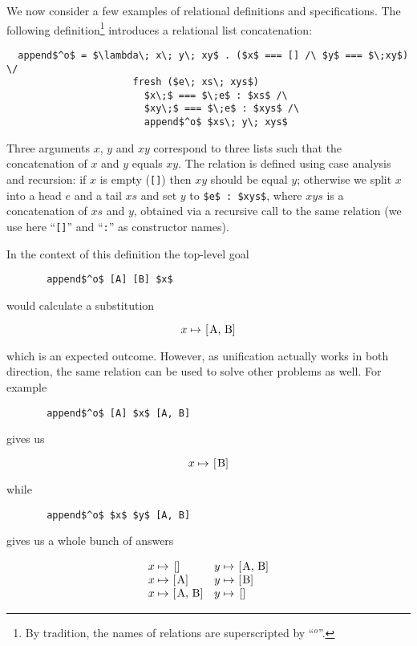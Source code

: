 We now consider a few examples of relational definitions and specifications. The following definition\footnote{By tradition, the names of relations are superscripted by ``$^o$''.}
introduces a relational list concatenation:

\begin{lstlisting}
  append$^o$ = $\lambda\; x\; y\; xy$ . ($x$ === [] /\ $y$ === $\;xy$) \/
                      fresh ($e\; xs\; xys$) 
                        $x\;$ === $\;e$ : $xs$ /\ 
                        $xy\;$ === $\;e$ : $xys$ /\ 
                        append$^o$ $xs\; y\; xys$
\end{lstlisting}

Three arguments $x$, $y$ and $xy$ correspond to three lists such that the concatenation of $x$ and $y$ equals $xy$. The relation is defined using case analysis and recursion: if
$x$ is empty (\lstinline|[]|) then $xy$ should be equal $y$; otherwise we split $x$ into a head $e$ and a tail $xs$ and set $y$ to \lstinline|$e$ : $xys$|, where
$xys$ is a concatenation of $xs$ and $y$, obtained via a recursive call to the same relation (we use here ``\lstinline|[]|'' and ``\lstinline|:|'' as constructor names).

In the context of this definition the top-level goal

\begin{lstlisting}
       append$^o$ [A] [B] $x$
\end{lstlisting}

would calculate a substitution

\[
x \mapsto \mbox{\lstinline|[A, B]|}
\]

which is an expected outcome. However, as unification actually works in both direction, the same relation can be used to solve other problems as well. For example

\begin{lstlisting}
       append$^o$ [A] $x$ [A, B]
\end{lstlisting}

gives us

\[
x \mapsto \mbox{\lstinline|[B]|}
\]

while

\begin{lstlisting}
       append$^o$ $x$ $y$ [A, B]
\end{lstlisting}

gives us a whole bunch of answers

\[
\begin{array}{ll}
  x \mapsto \mbox{\lstinline|[]|} & y \mapsto \mbox{\lstinline|[A, B]|} \\
  x \mapsto \mbox{\lstinline|[A]|} & y \mapsto \mbox{\lstinline|[B]|} \\
  x \mapsto \mbox{\lstinline|[A, B]|} & y \mapsto \mbox{\lstinline|[]|} 
\end{array}
\]

